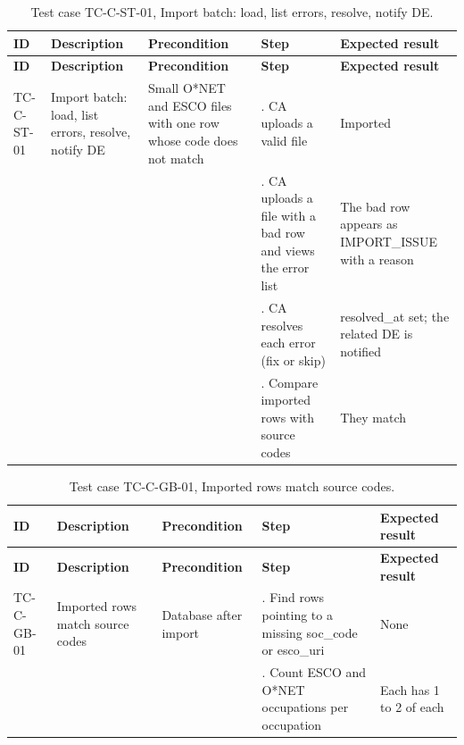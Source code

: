 {\small
\begin{longtable}{|>{\raggedright\arraybackslash}p{}|>{\raggedright\arraybackslash}p{}|>{\raggedright\arraybackslash}p{}|>{\raggedright\arraybackslash}p{}|>{\raggedright\arraybackslash}p{}|}
\caption{Test case TC-C-ST-01, Import batch: load, list errors, resolve, notify DE.} \\
\hline
\textbf{ID} & \textbf{Description} & \textbf{Precondition} & \textbf{Step} & \textbf{Expected result} \\ \hline
\endfirsthead
\hline
\textbf{ID} & \textbf{Description} & \textbf{Precondition} & \textbf{Step} & \textbf{Expected result} \\ \hline
\endhead
TC-C-ST-01 & Import batch: load, list errors, resolve, notify DE & Small O*NET and ESCO files with one row whose code does not match & 1. CA uploads a valid file & Imported \\ \hline
 &  &  & 2. CA uploads a file with a bad row and views the error list & The bad row appears as IMPORT\_ISSUE with a reason \\ \hline
 &  &  & 3. CA resolves each error (fix or skip) & resolved\_at set; the related DE is notified \\ \hline
 &  &  & 4. Compare imported rows with source codes & They match \\ \hline
\end{longtable}
}

{\small
\begin{longtable}{|>{\raggedright\arraybackslash}p{}|>{\raggedright\arraybackslash}p{}|>{\raggedright\arraybackslash}p{}|>{\raggedright\arraybackslash}p{}|>{\raggedright\arraybackslash}p{}|}
\caption{Test case TC-C-GB-01, Imported rows match source codes.} \\
\hline
\textbf{ID} & \textbf{Description} & \textbf{Precondition} & \textbf{Step} & \textbf{Expected result} \\ \hline
\endfirsthead
\hline
\textbf{ID} & \textbf{Description} & \textbf{Precondition} & \textbf{Step} & \textbf{Expected result} \\ \hline
\endhead
TC-C-GB-01 & Imported rows match source codes & Database after import & 1. Find rows pointing to a missing soc\_code or esco\_uri & None \\ \hline
 &  &  & 2. Count ESCO and O*NET occupations per occupation & Each has 1 to 2 of each \\ \hline
\end{longtable}
}

